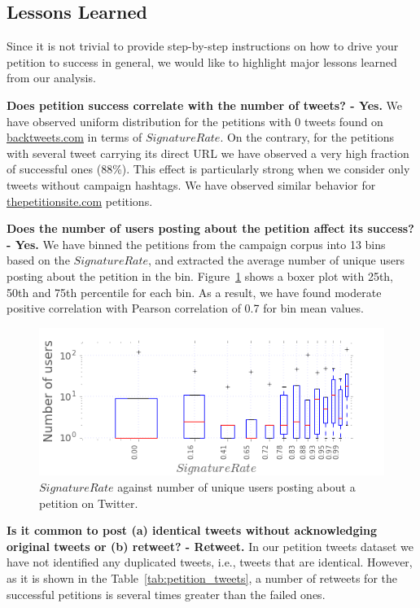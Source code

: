 \subsection{Lessons Learned}
\label{sec:discussion}
Since it is not trivial to provide step-by-step instructions on how to drive your petition to success in general, we would like to highlight major lessons learned from our analysis.

\textbf{Does petition success correlate with the number of tweets? - Yes.} We have observed uniform distribution for the petitions with 0 tweets found on \url{backtweets.com} in terms of $SignatureRate$. On the contrary, for the petitions with several tweet carrying its direct URL we have observed a very high fraction of successful ones (88\%). This effect is particularly strong when we consider only tweets without campaign hashtags. We have observed similar behavior for \url{thepetitionsite.com} petitions.

\textbf{Does the number of users posting about the petition affect its success? - Yes.} We have binned the petitions from the campaign corpus into 13 bins based on the $SignatureRate$, and extracted the average number of unique users posting about the petition in the bin. Figure~\ref{fig:signatures_vs_users} shows a boxer plot with 25th, 50th and 75th percentile for each bin. As a result, we have found moderate positive correlation with Pearson correlation of 0.7 for bin mean values.

\begin{figure}
\centering
\includegraphics[scale=0.45]{figures/signaturesgoalVSnumusersCampaigns.png}
\caption{$SignatureRate$ against number of unique users posting about a petition on Twitter.}
\label{fig:signatures_vs_users}
\end{figure}

\textbf{Is it common to post (a) identical tweets without acknowledging original tweets or (b) retweet? - Retweet.} In our petition tweets dataset we have not identified any duplicated tweets, i.e., tweets that are identical. However, as it is shown in the Table~\ref{tab:petition_tweets}, a number of retweets for the successful petitions is several times greater than the failed ones.

